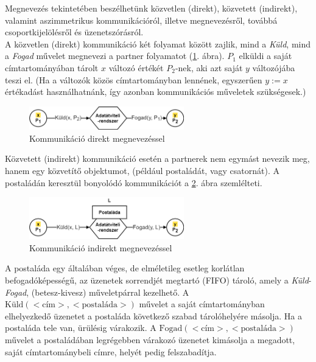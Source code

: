 \documentclass[tikz,12pt,margin=0px]{article}
\begin{document}
    Megnevezés tekintetében beszélhetünk közvetlen (direkt), közvetett (indirekt), valamint aszimmetrikus kommunikációról, illetve megnevezésről, továbbá csoportkijelölésről és üzenetszórásról.\\

    \noindent A közvetlen (direkt) kommunikáció két folyamat között zajlik, mind a \emph{Küld}, mind a \emph{Fogad} művelet megnevezi a partner folyamatot (\ref{direct_communication}. ábra). $P_1$ elküldi a saját címtartományában tárolt $x$ változó értékét $P_2$-nek, aki azt saját $y$ változójába teszi el. (Ha a változók közös címtartományban lennének, egyszerűen $y:=x$ értékadást használhatnánk, így azonban kommunikációs műveletek szükségesek.)

    \begin{figure}[H]
        \centering
        \includegraphics[width=0.6\textwidth]{img/direct_communication.png}
        \caption{Kommunikáció direkt megnevezéssel}
        \label{direct_communication}
    \end{figure}

    \noindent Közvetett (indirekt) kommunikáció esetén a partnerek nem egymást nevezik meg, hanem egy közvetítő objektumot, (például postaládát, vagy csatornát). A postaládán keresztül bonyolódó kommunikációt a \ref{indirect_communication}. ábra szemlélteti.

    \begin{figure}[H]
        \centering
        \includegraphics[width=0.6\textwidth]{img/indirect_communication.png}
        \caption{Kommunikáció indirekt megnevezéssel}
        \label{indirect_communication}
    \end{figure}

    \noindent A postaláda egy általában véges, de elméletileg esetleg korlátlan befogadóképességű, az üzenetek sorrendjét megtartó (FIFO) tároló, amely a \emph{Küld}-\emph{Fogad}, (betesz-kivesz) műveletpárral kezelhető. A $\text{Küld}(<\text{cím}>,<\text{postaláda}>)$ művelet a saját címtartományban elhelyezkedő üzenetet a postaláda következő szabad tárolóhelyére másolja. Ha a postaláda tele van, ürülésig várakozik. A $\text{Fogad}(<\text{cím}>,<\text{postaláda}>)$ művelet a postaládában legrégebben várakozó üzenetet kimásolja a megadott, saját címtartománybeli címre, helyét pedig felszabadítja.\\
\end{document}
